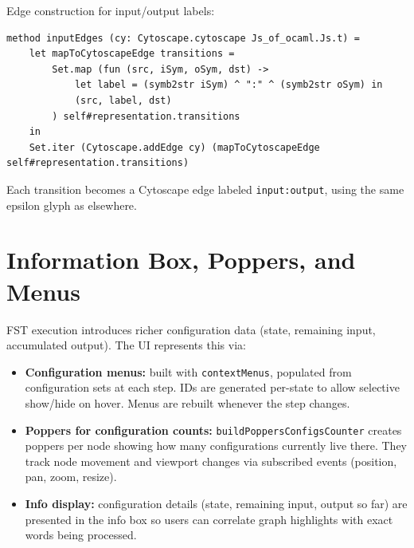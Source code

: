 Edge construction for input/output labels:
\begin{verbatim}
method inputEdges (cy: Cytoscape.cytoscape Js_of_ocaml.Js.t) =
	let mapToCytoscapeEdge transitions =
		Set.map (fun (src, iSym, oSym, dst) ->
			let label = (symb2str iSym) ^ ":" ^ (symb2str oSym) in
			(src, label, dst)
		) self#representation.transitions
	in
	Set.iter (Cytoscape.addEdge cy) (mapToCytoscapeEdge self#representation.transitions)
\end{verbatim}
Each transition becomes a Cytoscape edge labeled \texttt{input:output}, using the same epsilon glyph as elsewhere.

\section{Information Box, Poppers, and Menus}
\label{sec:oflat_infobox}
FST execution introduces richer configuration data (state, remaining input, accumulated output). The UI represents this via:
\begin{itemize}
  \item \textbf{Configuration menus:} built with \texttt{contextMenus}, populated from configuration sets at each step.
	  IDs are generated per-state to allow selective show/hide on hover. Menus are rebuilt whenever the step changes.
  \item \textbf{Poppers for configuration counts:} \texttt{buildPoppersConfigsCounter} creates poppers per node showing
	  how many configurations currently live there. They track node movement and viewport changes via subscribed events
	  (position, pan, zoom, resize).
  \item \textbf{Info display:} configuration details (state, remaining input, output so far) are presented in the info box
	  so users can correlate graph highlights with exact words being processed.
\end{itemize}

